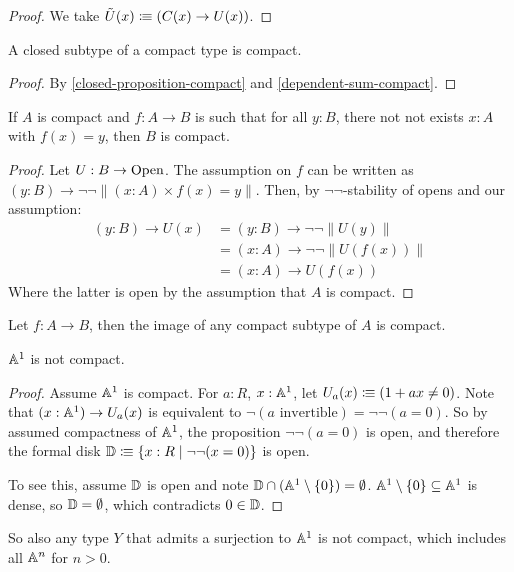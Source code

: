 \begin{proof}
  We take $\tilde{U}(x)\vcentcolon\mspace{-1.2mu}\equiv (C(x)\to U(x))$.
\end{proof}

\begin{lemma}
  \label{closed-subtype-compact}
  A closed subtype of a compact type is compact.
\end{lemma}

\begin{proof}
  By \cref{closed-proposition-compact} and \cref{dependent-sum-compact}.
\end{proof}

\begin{lemma}
  \label{not-not-surjection-compact}
  If $A$ is compact and $f:A\to B$ is such that for all $y:B$,
  there not not exists $x:A$ with $f(x)=y$,
  then $B$ is compact.
\end{lemma}

\begin{proof}
  Let $U:B\to\mathrm{Open}$.
  The assumption on $f$ can be written as $(y:B)\to \neg\neg \| (x:A)\times f(x)=y \|$.
  Then, by $\neg\neg$-stability of opens and our assumption:
  \begin{align*}
    (y:B)\to U(x) &= (y:B)\to \neg\neg \| U(y) \| \\
                  &= (x:A)\to \neg\neg \| U(f(x)) \| \\
                  &= (x:A)\to U(f(x))
  \end{align*}
  Where the latter is open by the assumption that $A$ is compact.
\end{proof}

\begin{corollary}
  \label{image-compact}
  Let $f:A\to B$, then the image of any compact subtype of $A$ is compact.
\end{corollary}

\begin{proposition}
  $\mathbb{A}^1$ is not compact.
\end{proposition}

\begin{proof}
  Assume $\mathbb{A}^1$ is compact.
  For $a:R$, $x:\mathbb{A}^1$, let $U_a(x)\vcentcolon\mspace{-1.2mu}\equiv (1+ax \neq 0)$.
  Note that $(x:\mathbb{A}^1)\to U_a(x)$ is equivalent to $\neg(\text{$a$ invertible})=\neg\neg(a=0)$.
  So by assumed compactness of $\mathbb{A}^1$, the proposition $\neg\neg(a=0)$ is open,
  and therefore the formal disk $\mathbb{D}\vcentcolon\mspace{-1.2mu}\equiv \{x:R\mid \neg\neg(x=0)\}$ is open.

  To see this, assume $\mathbb{D}$ is open and note $\mathbb{D}\cap (\mathbb{A}^1\setminus\{0\})=\emptyset$.
  $\mathbb{A}^1\setminus\{0\}\subseteq \mathbb{A}^1$ is dense, so $\mathbb{D}=\emptyset$, which contradicts $0\in\mathbb{D}$.
\end{proof}

So also any type $Y$ that admits a surjection to $\mathbb{A}^1$ is not compact, which includes all $\mathbb{A}^n$ for $n>0$.
